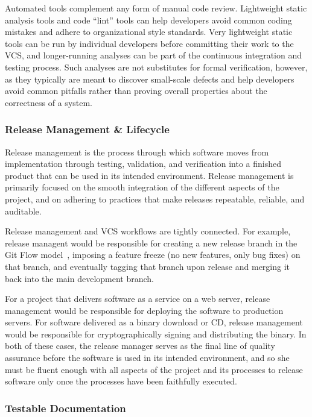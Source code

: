 Automated tools complement any form of manual code review. Lightweight
static analysis tools and code ``lint'' tools can help developers
avoid common coding mistakes and adhere to organizational style
standards. Very lightweight static tools can be run by individual
developers before committing their work to the VCS, and longer-running
analyses can be part of the continuous integration and testing
process. Such analyses are not substitutes for formal verification,
however, as they typically are meant to discover small-scale defects
and help developers avoid common pitfalls rather than proving overall
properties about the correctness of a system.

\subsubsection{Release Management \& Lifecycle}

Release management is the process through which software moves from
implementation through testing, validation, and verification into a
finished product that can be used in its intended environment. Release
management is primarily focused on the smooth integration of the
different aspects of the project, and on adhering to practices that
make releases repeatable, reliable, and auditable.

Release management and VCS workflows are tightly connected. For
example, release managent would be responsible for creating a new
release branch in the Git Flow model~\cite{atlassianworkflow},
imposing a feature freeze (no new features, only bug fixes) on that
branch, and eventually tagging that branch upon release and merging it
back into the main development branch.

For a project that delivers software as a service on a web server,
release management would be responsible for deploying the software to
production servers. For software delivered as a binary download or CD,
release management would be responsible for cryptographically signing
and distributing the binary. In both of these cases, the release
manager serves as the final line of quality assurance before the
software is used in its intended environment, and so she must be
fluent enough with all aspects of the project and its processes to
release software only once the processes have been faithfully
executed.

\subsubsection{Testable Documentation}

